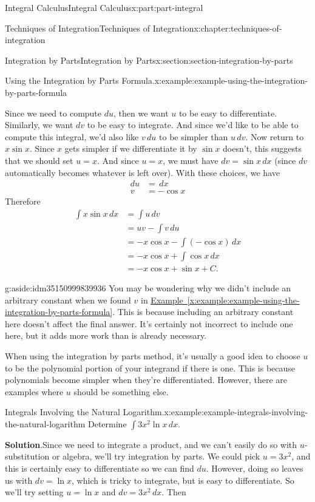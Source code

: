 \documentclass[twoside,10pt,]{book}
\newcommand{\blocktitlefont}{\relax}
\newcommand{\xreffont}{\relax}
\numberwithin{equation}{part}
\begin{document}
\begin{partptx}{Integral Calculus}{}{Integral Calculus}{}{}{x:part:part-integral}
\begin{chapterptx}{Techniques of Integration}{}{Techniques of Integration}{}{}{x:chapter:techniques-of-integration}
\begin{sectionptx}{Integration by Parts}{}{Integration by Parts}{}{}{x:section:section-integration-by-parts}
\begin{example}{Using the Integration by Parts Formula.}{x:example:example-using-the-integration-by-parts-formula}
\par
Since we need to compute \(du\), then we want \(u\) to be easy to differentiate. Similarly, we want \(dv\) to be easy to integrate. And since we'd like to be able to compute this integral, we'd also like \(v\,du\) to be simpler than \(u\,dv\). Now return to \(x\sin x\). Since \(x\) gets simpler if we differentiate it by \(\sin x\) doesn't, this suggests that we should set \(u = x\). And since \(u = x\), we must have \(dv = \sin x\,dx\) (since \(dv\) automatically becomes whatever is left over). With these choices, we have%
%
\begin{align*}
du & = \,dx \\
v & = -\cos x 
\end{align*}
Therefore%
%
\begin{align*}
\int x\sin x\,dx & = \int u\,dv \\
& = uv - \int v\,du \\
& = -x\cos x - \int (-\cos x)\,dx \\
& = -x\cos x + \int\cos x\,dx \\
& = -x\cos x + \sin x + C. 
\end{align*}
\end{example}
\begin{aside}{}{g:aside:idm35150999839936}%
You may be wondering why we didn't include an arbitrary constant when we found \(v\) in \hyperref[x:example:example-using-the-integration-by-parts-formula]{Example~{\xreffont\ref{x:example:example-using-the-integration-by-parts-formula}}}. This is because including an arbitrary constant here doesn't affect the final answer. It's certainly not incorrect to include one here, but it adds more work than is already necessary.%
\end{aside}
When using the integration by parts method, it's usually a good idea to choose \(u\) to be the polynomial portion of your integrand if there is one. This is because polynomials become simpler when they're differentiated. However, there are examples where \(u\) should be something else.%
\begin{example}{Integrals Involving the Natural Logarithm.}{x:example:example-integrals-involving-the-natural-logarithm}%
Determine \(\int 3x^{2}\ln x\,dx\).%
\par\smallskip%
\noindent\textbf{\blocktitlefont Solution}.\hypertarget{g:solution:idm35150999836224}{}\quad{}Since we need to integrate a product, and we can't easily do so with \(u\)-substitution or algebra, we'll try integration by parts. We could pick \(u = 3x^{2}\), and this is certainly easy to differentiate so we can find \(du\). However, doing so leaves us with \(dv = \ln x\), which is tricky to integrate, but is easy to differentiate. So we'll try setting \(u = \ln x\) and \(dv = 3x^{2}\,dx\). Then%

\end{example}
\end{sectionptx}
\end{chapterptx}
\end{partptx}
\end{document}
